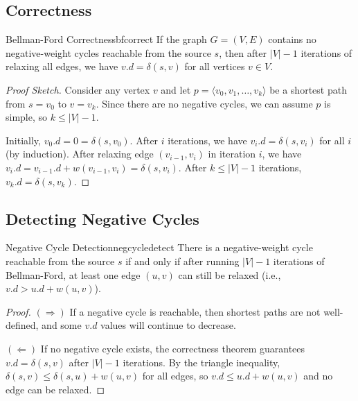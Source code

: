 \subsection{Correctness}

\begin{theorem}{Bellman-Ford Correctness}{bfcorrect}
If the graph $G = (V, E)$ contains no negative-weight cycles reachable from the source $s$, 
then after $|V|-1$ iterations of relaxing all edges, we have $v.d = \delta(s,v)$ for all 
vertices $v \in V$.
\end{theorem}

\begin{proof}[Proof Sketch]
Consider any vertex $v$ and let $p = \langle v_0, v_1, \ldots, v_k \rangle$ be a shortest 
path from $s = v_0$ to $v = v_k$. Since there are no negative cycles, we can assume $p$ is 
simple, so $k \le |V|-1$.

Initially, $v_0.d = 0 = \delta(s, v_0)$. After $i$ iterations, we have $v_i.d = \delta(s, v_i)$ 
for all $i$ (by induction). After relaxing edge $(v_{i-1}, v_i)$ in iteration $i$, we have 
$v_i.d = v_{i-1}.d + w(v_{i-1}, v_i) = \delta(s, v_i)$. After $k \le |V|-1$ iterations, 
$v_k.d = \delta(s, v_k)$.
\end{proof}

\subsection{Detecting Negative Cycles}

\begin{theorem}{Negative Cycle Detection}{negcycledetect}
There is a negative-weight cycle reachable from the source $s$ if and only if after running 
$|V|-1$ iterations of Bellman-Ford, at least one edge $(u,v)$ can still be relaxed 
(i.e., $v.d > u.d + w(u,v)$).
\end{theorem}

\begin{proof}
$(\Rightarrow)$ If a negative cycle is reachable, then shortest paths are not well-defined, 
and some $v.d$ values will continue to decrease.

$(\Leftarrow)$ If no negative cycle exists, the correctness theorem guarantees $v.d = \delta(s,v)$ 
after $|V|-1$ iterations. By the triangle inequality, $\delta(s,v) \le \delta(s,u) + w(u,v)$ 
for all edges, so $v.d \le u.d + w(u,v)$ and no edge can be relaxed.
\end{proof}

